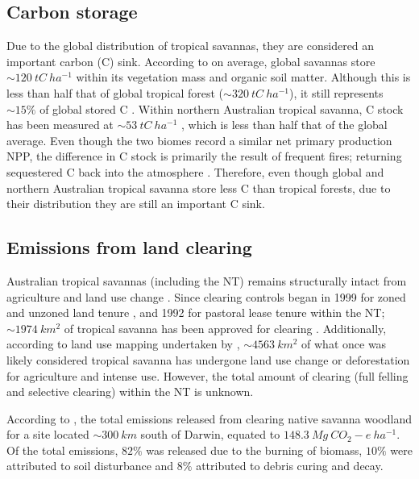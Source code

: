 \subsection{Carbon storage}
Due to the global distribution of tropical savannas, they are considered an important carbon (C) sink. According to \cite{Graceetal2006} on average, global savannas store $\sim120 \ tC \ ha^{-1}$ within its vegetation mass and organic soil matter. Although this is less than half that of global tropical forest ($\sim320 \ tC \ ha^{-1}$), it still represents $\sim15 \%$ of global stored C \citep{Graceetal2006}. Within northern Australian tropical savanna, C stock has been measured at $\sim53 \ tC \ ha^{-1}$ \citep{chenetal2002}, which is less than half that of the global average. Even though the two biomes record a similar net primary production NPP, the difference in C stock is primarily the result of frequent fires; returning sequestered C back into the atmosphere \citep{Graceetal2006}. Therefore, even though global and northern Australian tropical savanna store less C than tropical forests, due to their distribution they are still an important C sink.

\subsection{Emissions from land clearing}
Australian tropical savannas (including the NT) remains structurally intact from agriculture and land use change \citep{franklinetal2008, hutleyetal2016, kuttetal2012}. Since clearing controls began in 1999 for zoned and unzoned land tenure \citep{ntplanningact1999}, and 1992 for pastoral lease tenure \citep{ntpastorallandact1992} within the NT; $\sim1974\ km^2$ of tropical savanna has been approved for clearing \citep{unzonedclearing2022, pastoralclearing2022}. Additionally, according to land use mapping undertaken by \cite{landuse2016}, $\sim4563 \ km^2$ of what once was likely considered tropical savanna has undergone land use change or deforestation for agriculture and intense use. However, the total amount of clearing (full felling and selective clearing) within the NT is unknown.

According to \cite{hutleyetal2016}, the total emissions released from clearing native savanna woodland for a site located $\sim300 \ km$ south of Darwin, equated to $148.3 \ Mg\ CO_{2}-e \ ha^{-1}$. Of the total emissions, $82\%$ was released due to the burning of biomass, $10\%$ were attributed to soil disturbance and $8\%$ attributed to debris curing and decay.

